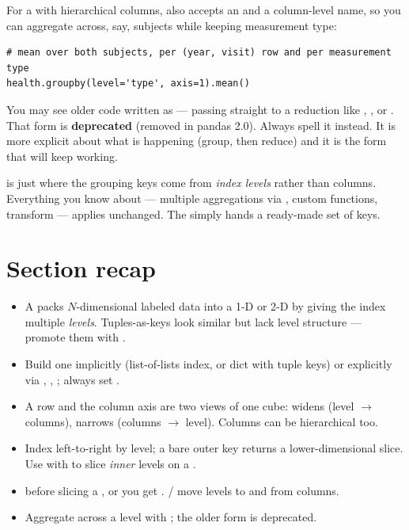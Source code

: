 \documentclass[11pt]{article}
\begin{document}
For a  with hierarchical columns,  also accepts an  and a column-level name, so you can aggregate across, say, subjects while keeping measurement type:

\begin{lstlisting}
# mean over both subjects, per (year, visit) row and per measurement type
health.groupby(level='type', axis=1).mean()
\end{lstlisting}

\begin{pitfall}
You may see older code written as  --- passing  straight to a reduction like , , or . That form is \textbf{deprecated} (removed in pandas 2.0). Always spell it  instead. It is more explicit about what is happening (group, then reduce) and it is the form that will keep working.
\end{pitfall}

\begin{keyidea}
 is just  where the grouping keys come from \emph{index levels} rather than columns. Everything you know about  --- multiple aggregations via , custom functions, transform --- applies unchanged. The  simply hands  a ready-made set of keys.
\end{keyidea}

\section*{Section recap}
\begin{itemize}
  \item A  packs $N$-dimensional labeled data into a 1-D  or 2-D  by giving the index multiple \emph{levels}. Tuples-as-keys look similar but lack level structure --- promote them with .
  \item Build one implicitly (list-of-lists index, or dict with tuple keys) or explicitly via , , ; always set .
  \item A row  and the column axis are two views of one cube:  widens (level $\to$ columns),  narrows (columns $\to$ level). Columns can be hierarchical too.
  \item Index left-to-right by level; a bare outer key returns a lower-dimensional slice. Use  with  to slice \emph{inner} levels on a .
  \item {} before slicing a , or you get . / move levels to and from columns.
  \item Aggregate across a level with ; the older  form is deprecated.
\end{itemize}
\end{document}
